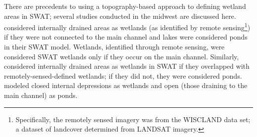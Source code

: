 	
	There are precedents to using a topography-based approach to defining wetland areas in SWAT; several studies conducted in the midwest are discussed here. \citet{almendinger_constructing_2007} considered internally drained areas as wetlands (as identified by remote sensing\footnote{Specifically, the remotely sensed imagery was from the WISCLAND data set; a dataset of landcover determined from LANDSAT imagery.}) if they were not connected to the main channel and lakes were considered ponds in their SWAT model. Wetlands, identified through remote sensing, were considered SWAT wetlands only if they occur on the main channel. Similarly, \citet{kirsch_predicting_2002} considered internally drained areas as wetlands in SWAT if they overlapped with remotely-sensed-defined wetlands; if they did not, they were considered ponds.  \citet{almendinger_constructing_2010} modeled closed internal depressions as wetlands and open (those draining to the main channel) as ponds.



